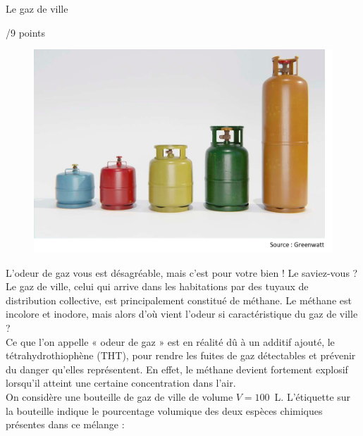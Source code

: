 \begin{doc}{Le gaz de ville \begin{large}
    /9 points
\end{large}}
\vspace{-0.4cm}
\begin{figure}
\vspace{-0cm}
    \centering
      \includegraphics[scale=0.35]{Images/DS/Devoir_Commun/Bouteille_gaz.png}
  \end{figure}
L'odeur de gaz vous est désagréable, mais c'est pour votre bien ! Le saviez-vous ?\\
Le gaz de ville, celui qui arrive dans les habitations par des tuyaux de distribution collective, est principalement constitué de méthane. Le méthane est incolore et inodore, mais alors d'où vient l'odeur si caractéristique du gaz de ville ?\\
Ce que l'on appelle « odeur de gaz » est en réalité dû à un additif ajouté, le tétrahydrothiophène (THT), pour rendre les fuites de gaz détectables et prévenir du danger qu’elles représentent. En effet, le méthane devient fortement explosif lorsqu'il atteint une certaine concentration dans l'air.\\

On considère une bouteille de gaz de ville de volume $V=100$~L. L’étiquette sur la bouteille indique le pourcentage volumique des deux espèces chimiques présentes dans ce mélange :


\end{doc}

